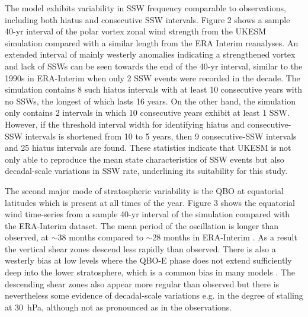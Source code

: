 \documentclass[wcd, manuscript]{copernicus}
\begin{document}
The model exhibits variability in SSW frequency comparable to observations, including both hiatus and consecutive SSW intervals. Figure 2 shows a sample 40-yr interval of the polar vortex zonal wind strength from the UKESM simulation compared with a similar length from the ERA Interim reanalyses. An extended interval of mainly westerly anomalies indicating a strengthened vortex and lack of SSWs can be seen towards the end of the 40-yr interval, similar to the 1990s in ERA-Interim when only 2 SSW events were recorded in the decade. The simulation contains 8 such hiatus intervals with at least 10 consecutive years with no SSWs, the longest of which lasts 16 years. On the other hand, the simulation only contains 2 intervals in which 10 consecutive years exhibit at least 1 SSW. However, if the threshold interval width for identifying hiatus and consecutive-SSW intervals is shortened from 10 to 5 years,  then 9 consecutive-SSW intervals and 25 hiatus intervals are found. These statistics indicate that UKESM is not only able to reproduce the mean state characteristics of SSW events but also decadal-scale variations in SSW rate, underlining its  suitability for this study. 

The second major mode of stratospheric variability is the QBO at equatorial latitudes which is present at all times of the year. Figure 3 shows the equatorial wind time-series from a sample 40-yr interval of the simulation compared with the ERA-Interim dataset. The mean period of the oscillation is longer than observed, at $\sim$38 months compared to $\sim$28 months in ERA-Interim \citep{Kawatani2016}. As a result the vertical shear zones descend less rapidly than observed. There is also a westerly bias at low levels where the QBO-E phase does not extend sufficiently deep into the lower stratosphere, which is a common bias in many models \citep{Bushell2020}. The descending shear zones also appear more regular than observed but there is nevertheless some evidence of decadal-scale variations e.g. in the degree of stalling at 30\ hPa, although not as pronounced as in the observations.
\end{document}
